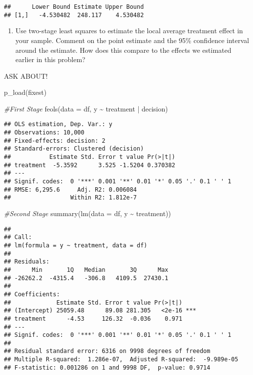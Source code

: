 \documentclass[
]{article}
\newenvironment{Shaded}{\begin{snugshade}}{\end{snugshade}}
\newcommand{\AttributeTok}[1]{\textcolor[rgb]{0.77,0.63,0.00}{#1}}
\newcommand{\CommentTok}[1]{\textcolor[rgb]{0.56,0.35,0.01}{\textit{#1}}}
\newcommand{\FunctionTok}[1]{\textcolor[rgb]{0.00,0.00,0.00}{#1}}
\newcommand{\NormalTok}[1]{#1}
\newcommand{\SpecialCharTok}[1]{\textcolor[rgb]{0.00,0.00,0.00}{#1}}
\providecommand{\tightlist}{%
  \setlength{\itemsep}{0pt}\setlength{\parskip}{0pt}}
\begin{document}
\begin{verbatim}
##      Lower Bound Estimate Upper Bound
## [1,]   -4.530482  248.117    4.530482
\end{verbatim}

\begin{enumerate}
\def\labelenumi{\arabic{enumi}.}
\setcounter{enumi}{5}
\tightlist
\item
  Use two-stage least squares to estimate the local average treatment
  effect in your sample. Comment on the point estimate and the 95\%
  confidence interval around the estimate. How does this compare to the
  effects we estimated earlier in this problem?
\end{enumerate}

ASK ABOUT!

\begin{Shaded}
\begin{Highlighting}[]
\FunctionTok{p\_load}\NormalTok{(fixest)}

\CommentTok{\#First Stage}
\FunctionTok{feols}\NormalTok{(}\AttributeTok{data =}\NormalTok{ df, y }\SpecialCharTok{\textasciitilde{}}\NormalTok{ treatment }\SpecialCharTok{|}\NormalTok{ decision)}
\end{Highlighting}
\end{Shaded}

\begin{verbatim}
## OLS estimation, Dep. Var.: y
## Observations: 10,000 
## Fixed-effects: decision: 2
## Standard-errors: Clustered (decision) 
##           Estimate Std. Error t value Pr(>|t|) 
## treatment  -5.3592      3.525 -1.5204 0.370382 
## ---
## Signif. codes:  0 '***' 0.001 '**' 0.01 '*' 0.05 '.' 0.1 ' ' 1
## RMSE: 6,295.6     Adj. R2: 0.006084
##                 Within R2: 1.812e-7
\end{verbatim}

\begin{Shaded}
\begin{Highlighting}[]
\CommentTok{\#Second Stage}
\FunctionTok{summary}\NormalTok{(}\FunctionTok{lm}\NormalTok{(}\AttributeTok{data =}\NormalTok{ df, y }\SpecialCharTok{\textasciitilde{}}\NormalTok{ treatment))}
\end{Highlighting}
\end{Shaded}

\begin{verbatim}
## 
## Call:
## lm(formula = y ~ treatment, data = df)
## 
## Residuals:
##      Min       1Q   Median       3Q      Max 
## -26262.2  -4315.4   -306.8   4109.5  27430.1 
## 
## Coefficients:
##             Estimate Std. Error t value Pr(>|t|)    
## (Intercept) 25059.48      89.08 281.305   <2e-16 ***
## treatment      -4.53     126.32  -0.036    0.971    
## ---
## Signif. codes:  0 '***' 0.001 '**' 0.01 '*' 0.05 '.' 0.1 ' ' 1
## 
## Residual standard error: 6316 on 9998 degrees of freedom
## Multiple R-squared:  1.286e-07,  Adjusted R-squared:  -9.989e-05 
## F-statistic: 0.001286 on 1 and 9998 DF,  p-value: 0.9714
\end{verbatim}
\end{document}
